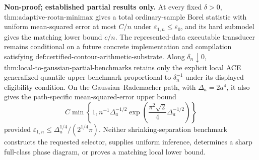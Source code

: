 \textbf{Non-proof; established partial results only.} At every fixed \(\delta>0\), \(\text{thm:adaptive-rootn-minimax}\) gives a total ordinary-sample Borel statistic with uniform mean-squared error at most \(C/n\) under \(\varepsilon_{1,n}\le\varepsilon_0\), and its hard submodel gives the matching lower bound \(c/n\). The represented-data executable transducer remains conditional on a future concrete implementation and compilation satisfying \(\text{def:certified-contour-arithmetic-substrate}\). Along \(\delta_n\downarrow0\), \(\text{thm:local-to-gaussian-partial-benchmarks}\) retains only the explicit local ACE generalized-quantile upper benchmark proportional to \(\delta_n^{-1}\) under its displayed eligibility condition. On the Gaussian--Rademacher path, with \(\Delta_a=2a^4\), it also gives the path-specific mean-squared-error upper bound \[ C\min\!\left\{1, n^{-1}\Delta_a^{-1/2} \exp\!\left(\frac{\pi^2\sqrt2}{4}\Delta_a^{-1/2}\right) \right\} \] provided \(\varepsilon_{1,n}\le\Delta_a^{1/4}/(2^{1/4}\pi)\). Neither shrinking-separation benchmark constructs the requested selector, supplies uniform inference, determines a sharp full-class phase diagram, or proves a matching local lower bound.